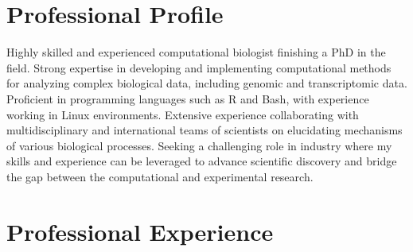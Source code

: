 \documentclass[11pt,a4paper,]{awesome-cv}
\begin{document}
\makecvheader






\hypertarget{professional-profile}{%
\section{Professional Profile}\label{professional-profile}}

Highly skilled and experienced computational biologist finishing a PhD
in the field. Strong expertise in developing and implementing
computational methods for analyzing complex biological data, including
genomic and transcriptomic data. Proficient in programming languages
such as R and Bash, with experience working in Linux environments.
Extensive experience collaborating with multidisciplinary and
international teams of scientists on elucidating mechanisms of various
biological processes. Seeking a challenging role in industry where my
skills and experience can be leveraged to advance scientific discovery
and bridge the gap between the computational and experimental research.

\hypertarget{professional-experience}{%
\section{Professional Experience}\label{professional-experience}}
\end{document}
